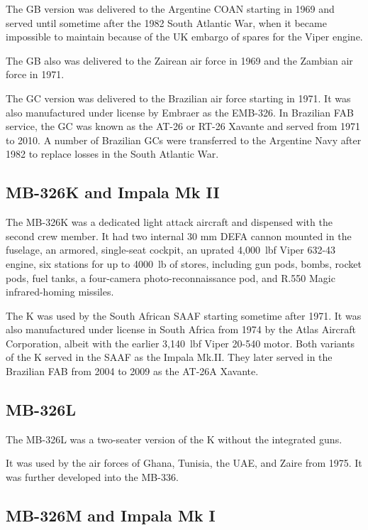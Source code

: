 The GB version was delivered to the Argentine COAN starting in 1969 and served until sometime after the 1982 South Atlantic War, when it became impossible to maintain because of the UK embargo of spares for the Viper engine.

The GB also was delivered to the Zairean air force in 1969 and the Zambian air force in 1971.

The GC version was delivered to the Brazilian air force starting in 1971. It was also manufactured under license by Embraer as the EMB-326. In Brazilian FAB service, the GC was known as the AT-26 or RT-26 Xavante and served from 1971 to 2010. A number of Brazilian GCs were transferred to the Argentine Navy after 1982 to replace losses in the South Atlantic War.

\subsection{MB-326K and Impala Mk II}

The MB-326K was a dedicated light attack aircraft and dispensed with the second crew member. It had two internal 30 mm DEFA cannon mounted in the fuselage, an armored, single-seat cockpit, an uprated 4,000~lbf Viper 632-43 engine, six stations for up to 4000~lb of stores, including gun pods, bombs, rocket pods, fuel tanks, a four-camera photo-reconnaissance pod, and R.550 Magic infrared-homing missiles.

The K was used by the South African SAAF starting sometime after 1971. It was also manufactured under license in South Africa from 1974 by the Atlas Aircraft Corporation, albeit with the earlier 3,140~lbf Viper 20-540 motor. Both variants of the K served in the SAAF as the Impala Mk.II. They later served in the Brazilian FAB from 2004 to 2009 as the AT-26A Xavante.

\subsection{MB-326L}

The MB-326L was a two-seater version of the K without the integrated guns.

It was used by the air forces of Ghana, Tunisia, the UAE, and Zaire from 1975. It was further developed into the MB-336.

\subsection{MB-326M and Impala Mk I}

